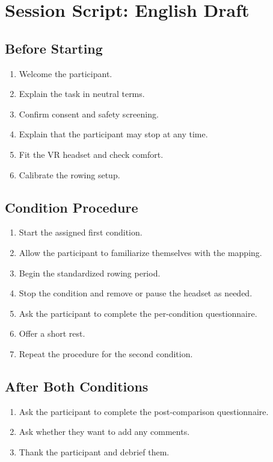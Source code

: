 \section{Session Script: English Draft}
\label{app:study_materials_session_script_english}

\subsection*{Before Starting}

\begin{enumerate}
    \item Welcome the participant.
    \item Explain the task in neutral terms.
    \item Confirm consent and safety screening.
    \item Explain that the participant may stop at any time.
    \item Fit the VR headset and check comfort.
    \item Calibrate the rowing setup.
\end{enumerate}

\subsection*{Condition Procedure}

\begin{enumerate}
    \item Start the assigned first condition.
    \item Allow the participant to familiarize themselves with the mapping.
    \item Begin the standardized rowing period.
    \item Stop the condition and remove or pause the headset as needed.
    \item Ask the participant to complete the per-condition questionnaire.
    \item Offer a short rest.
    \item Repeat the procedure for the second condition.
\end{enumerate}

\subsection*{After Both Conditions}

\begin{enumerate}
    \item Ask the participant to complete the post-comparison questionnaire.
    \item Ask whether they want to add any comments.
    \item Thank the participant and debrief them.
\end{enumerate}



